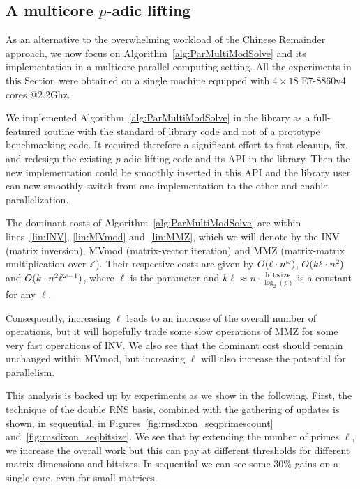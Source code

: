 \subsection{A multicore $p$-adic lifting}

As an alternative to the overwhelming workload of the Chinese Remainder
approach, we now focus on Algorithm~\ref{alg:ParMultiModSolve} and its
implementation in a multicore parallel computing setting.
All the experiments in this Section were obtained on a single machine
equipped with $4{\times}18$ E7-8860v4 cores @2.2Ghz.

We implemented Algorithm~\ref{alg:ParMultiModSolve} in the \Linbox
library as a full-featured routine with the standard of library code and not of
a prototype benchmarking code. It required therefore a significant effort to
first cleanup, fix, and redesign the existing $p$-adic lifting code and its API
in the library. Then the new implementation could be smoothly inserted in this
API and the library user can now smoothly switch from one implementation to the
other and enable parallelization.

The dominant costs of Algorithm~\ref{alg:ParMultiModSolve}
are within lines~\ref{lin:INV}, \ref{lin:MVmod} and~\ref{lin:MMZ},
which we will denote by the INV (matrix inversion), MVmod
(matrix-vector iteration) and MMZ (matrix-matrix multiplication over
$\mathbb{Z}$).
Their respective costs are given by $\GO{\ell\cdot{}n^\omega}$,
$\GO{k\ell\cdot{}n^2}$ and $\GO{k\cdot{}n^2\ell^{\omega-1}}$,
where $\ell$ is the parameter and $k\ell\approx n \cdot
\frac{\texttt{bitsize}}{\log_2(p)}$ is a constant for any $\ell$.

Consequently, increasing $\ell$ leads to an increase of the overall number
of operations, but it will hopefully trade some slow operations of MMZ
for some very fast operations of INV.
We also see that the dominant cost should remain unchanged within MVmod, but
increasing $\ell$ will also increase the potential for parallelism.

This analysis is backed up by experiments as we show in the following.
%
First, the technique of the double RNS basis, combined with the
gathering of updates is shown, in sequential, in
Figures~\ref{fig:rnsdixon_seqprimescount}
and~\ref{fig:rnsdixon_seqbitsize}. We see that by extending the number of primes
$\ell$, we increase the overall work but this 
can pay at different thresholds for different matrix dimensions and
bitsizes. In sequential we can see some $30\%$ gains on a single core,
even for small matrices.


